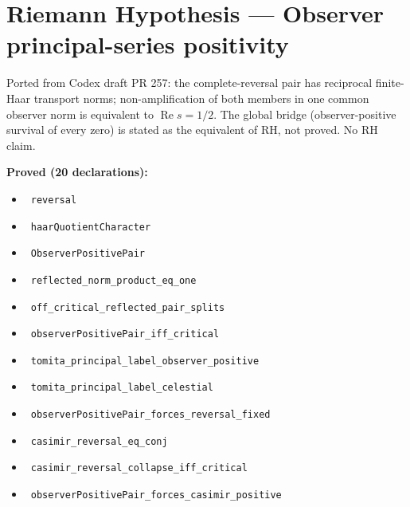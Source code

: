 \documentclass{report}
\theoremstyle{definition}
\begin{document}
\section{Riemann Hypothesis --- Observer principal-series positivity}
Ported from Codex draft PR 257: the complete-reversal pair has reciprocal finite-Haar transport norms; non-amplification of both members in one common observer norm is equivalent to $\operatorname{Re}s=1/2$. The global bridge (observer-positive survival of every zero) is stated as the equivalent of RH, not proved. No RH claim.

\noindent\textbf{Proved (20 declarations):}
\begin{itemize}
  \item {}\leanok\ \texttt{reversal}
  \item {}\leanok\ \texttt{haarQuotientCharacter}
  \item {}\leanok\ \texttt{ObserverPositivePair}
  \item {}\leanok\ \texttt{reflected\_norm\_product\_eq\_one}
  \item {}\leanok\ \texttt{off\_critical\_reflected\_pair\_splits}
  \item {}\leanok\ \texttt{observerPositivePair\_iff\_critical}
  \item {}\leanok\ \texttt{tomita\_principal\_label\_observer\_positive}
  \item {}\leanok\ \texttt{tomita\_principal\_label\_celestial}
  \item {}\leanok\ \texttt{observerPositivePair\_forces\_reversal\_fixed}
  \item {}\leanok\ \texttt{casimir\_reversal\_eq\_conj}
  \item {}\leanok\ \texttt{casimir\_reversal\_collapse\_iff\_critical}
  \item {}\leanok\ \texttt{observerPositivePair\_forces\_casimir\_positive}

\end{itemize}
\end{document}
